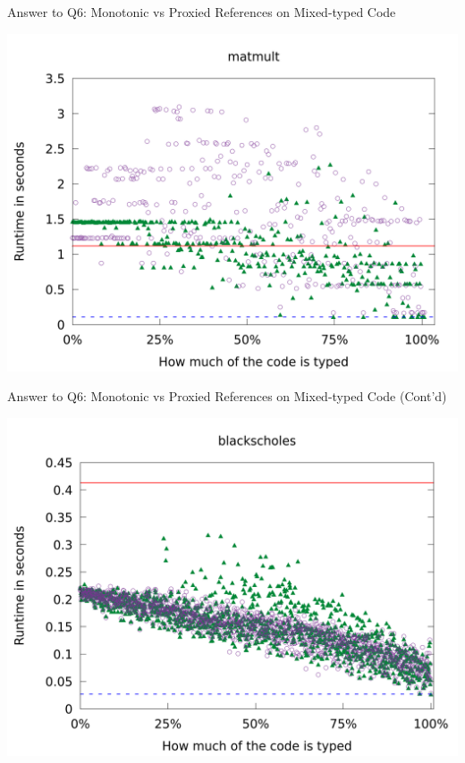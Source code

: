 \documentclass[12pt,dvipsnames]{beamer}
\begin{document}
\begin{frame}{Answer to Q6: Monotonic vs Proxied References on Mixed-typed Code}
  \begin{center}
    \includegraphics[scale=0.25]{new_plots/Specialized_UniformClosure_Coercions_Lazy/runtimes/matmult.png}
  \end{center}
\end{frame}

\begin{frame}{Answer to Q6: Monotonic vs Proxied References on Mixed-typed Code (Cont'd)}
  \begin{center}
    \includegraphics[scale=0.25]{new_plots/Specialized_UniformClosure_Coercions_Lazy/runtimes/blackscholes.png}
  \end{center}
\end{frame}
\end{document}
